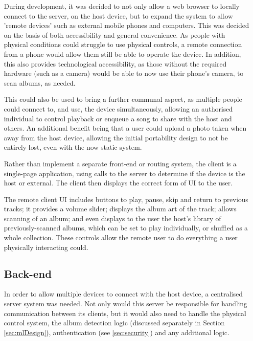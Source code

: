                 During development, it was decided to not only allow a web browser to locally connect to the server, on the host device, but to expand the system to allow 'remote devices' such as external mobile phones and computers. This was decided on the basis of both accessibility and general convenience. As people with physical conditions could struggle to use physical controls, a remote connection from a phone would allow them still be able to operate the device. In addition, this also provides technological accessibility, as those without the required hardware (such as a camera) would be able to now use their phone's camera, to scan albums, as needed.
    
                This could also be used to bring a further communal aspect, as multiple people could connect to, and use, the device simultaneously, allowing an authorised individual to control playback or enqueue a song to share with the host and others. An additional benefit being that a user could upload a photo taken when away from the host device, allowing the initial portability design to not be entirely lost, even with the now-static system.
    
                Rather than implement a separate front-end or routing system, the client is a single-page application, using calls to the server to determine if the device is the host or external. The client then displays the correct form of UI to the user.
    
                The remote client UI includes buttons to play, pause, skip and return to previous tracks; it provides a volume slider; displays the album art of the track; allows scanning of an album; and even displays to the user the host's library of previously-scanned albums, which can be set to play individually, or shuffled as a whole collection. These controls allow the remote user to do everything a user physically interacting could.
        
        \subsection{Back-end}
    
            In order to allow multiple devices to connect with the host device, a centralised server system was needed. Not only would this server be responsible for handling communication between its clients, but it would also need to handle the physical control system, the album detection logic (discussed separately in Section \ref{sec:mlDesign}), authentication (see \ref{sec:security}) and any additional logic.
    
